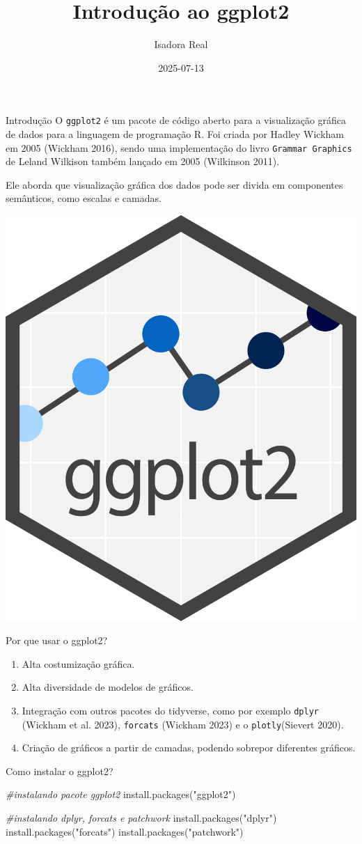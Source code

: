 \documentclass[
  ignorenonframetext,
]{beamer}
\title{Introdução ao ggplot2}
\author{Isadora Real}
\date{2025-07-13}
\newenvironment{Shaded}{}{}
\newcommand{\CommentTok}[1]{\textcolor[rgb]{0.38,0.63,0.69}{\textit{#1}}}
\newcommand{\FunctionTok}[1]{\textcolor[rgb]{0.02,0.16,0.49}{#1}}
\newcommand{\NormalTok}[1]{#1}
\newcommand{\StringTok}[1]{\textcolor[rgb]{0.25,0.44,0.63}{#1}}
\begin{document}
\frame{\titlepage}


\begin{frame}[fragile]{Introdução}
\label{introduuxe7uxe3o}
O \texttt{ggplot2} é um pacote de código aberto para a visualização
gráfica de dados para a linguagem de programação R. Foi criada por
Hadley Wickham em 2005 (Wickham 2016), sendo uma implementação do livro
\texttt{Grammar\ Graphics} de Leland Wilkison também lançado em 2005
(Wilkinson 2011).

Ele aborda que visualização gráfica dos dados pode ser divida em
componentes semânticos, como escalas e camadas.

\begin{center}
\includegraphics[width=0.2\linewidth,height=\textheight,keepaspectratio]{Ggplot2_hex_logo.svg.png}
\end{center}
\end{frame}

\begin{frame}[fragile]{Por que usar o ggplot2?}
\label{por-que-usar-o-ggplot2}
\begin{enumerate}
\item
  Alta costumização gráfica.
\item
  Alta diversidade de modelos de gráficos.
\item
  Integração com outros pacotes do tidyverse, como por exemplo
  \texttt{dplyr} (Wickham et al. 2023), \texttt{forcats} (Wickham 2023)
  e o \texttt{plotly}(Sievert 2020).
\item
  Criação de gráficos a partir de camadas, podendo sobrepor diferentes
  gráficos.
\end{enumerate}
\end{frame}

\begin{frame}[fragile]{Como instalar o ggplot2?}
\label{como-instalar-o-ggplot2}
\begin{Shaded}
\begin{Highlighting}[]
\CommentTok{\#instalando pacote ggplot2}
\FunctionTok{install.packages}\NormalTok{(}\StringTok{"ggplot2"}\NormalTok{)}

\CommentTok{\#instalando dplyr, forcats e patchwork}
\FunctionTok{install.packages}\NormalTok{(}\StringTok{"dplyr"}\NormalTok{)}
\FunctionTok{install.packages}\NormalTok{(}\StringTok{"forcats"}\NormalTok{)}
\FunctionTok{install.packages}\NormalTok{(}\StringTok{"patchwork"}\NormalTok{)}
\end{Highlighting}
\end{Shaded}
\end{frame}
\end{document}
